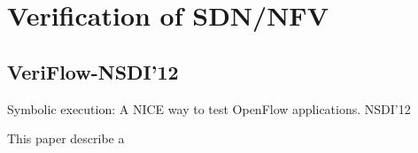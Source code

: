 %
%
%

\chapter{Verification of SDN/NFV}
\label{intro} %


\section{VeriFlow-NSDI'12}
\label{sec:1}

Symbolic execution: A NICE way to test OpenFlow applications. NSDI'12

\textcolor{Consistency caring about calculating delay.}

\textcolor{Trie is used in match-action protocol, what about other complex 'match' actions?}



This paper describe a 